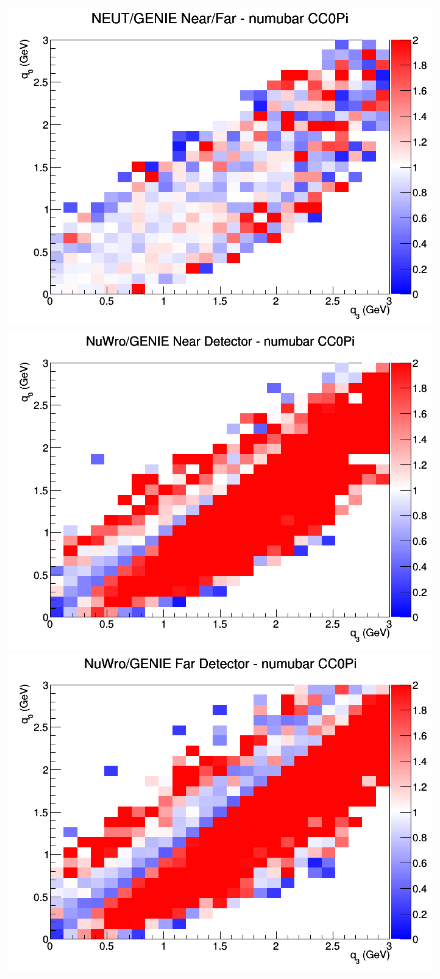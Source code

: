 \begin{figure}[h]
\endminipage
{}
\includegraphics[width=\linewidth]{eff_q0_q3/LAr/ratios/CC0Pi_NEUT_GENIE_numubar_NF_q3_q0.png}
\endminipage
\newline
{}
\includegraphics[width=\linewidth]{eff_q0_q3/LAr/ratios/CC0Pi_NuWro_GENIE_numubar_near_q3_q0.png}
\endminipage
{}
\includegraphics[width=\linewidth]{eff_q0_q3/LAr/ratios/CC0Pi_NuWro_GENIE_numubar_far_q3_q0.png}

\end{figure}

